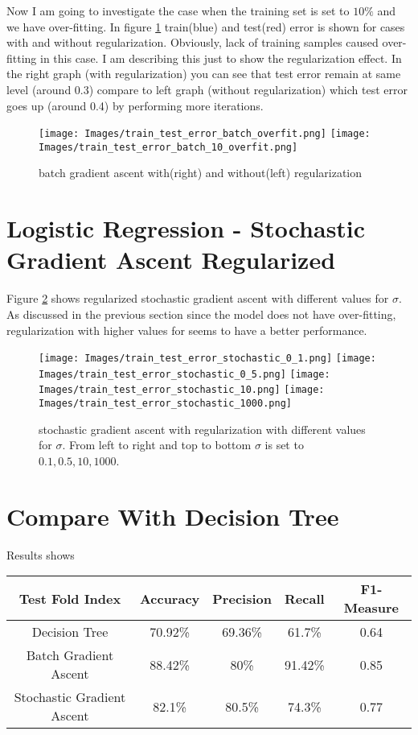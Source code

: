 \documentclass[12pt]{article}
\begin{document}
Now I am going to investigate the case when the training set is set to $10\%$ and we have over-fitting. In figure \ref{over_fitting} train(blue) and test(red) error is shown for cases with and without regularization. Obviously, lack of training samples caused over-fitting in this case. I am describing this just to show the regularization effect. In the right graph (with regularization) you can see that test error remain at same level (around 0.3) compare to left graph (without regularization) which test error goes up (around 0.4) by performing more iterations.
\begin{figure}
  \caption{batch gradient ascent with(right) and without(left) regularization}
  \centering
  \texttt{[image: Images/train\_test\_error\_batch\_overfit.png]}
  \texttt{[image: Images/train\_test\_error\_batch\_10\_overfit.png]}
  \label{over_fitting}
\end{figure}
\newpage
\section{Logistic Regression - Stochastic Gradient Ascent Regularized}
Figure \ref{fig:stochastic_reg} shows regularized stochastic gradient ascent with different values for $\sigma$. As discussed in the previous section since the model does not have over-fitting, regularization with higher values for seems to have a better performance.
\begin{figure}
  \caption{stochastic gradient ascent with regularization with different values for $\sigma$. From left to right and top to bottom $\sigma$ is set to $0.1, 0.5, 10, 1000$.}
  \centering
  \texttt{[image: Images/train\_test\_error\_stochastic\_0\_1.png]}
  \texttt{[image: Images/train\_test\_error\_stochastic\_0\_5.png]}
  \texttt{[image: Images/train\_test\_error\_stochastic\_10.png]}
    \texttt{[image: Images/train\_test\_error\_stochastic\_1000.png]}
  \label{fig:stochastic_reg}
\end{figure}
\newpage
\section{Compare With Decision Tree}
Results shows
\centering
\begin{tabular}{| c | c | c | c | c | }
  \hline
   Test Fold Index& Accuracy & Precision & Recall & F1-Measure \\
  \hline
      Decision Tree& 70.92\%  & 69.36\% & 61.7\% & 0.64  \\
  \hline
      Batch Gradient Ascent& 88.42\%  & 80\% & 91.42\% & 0.85  \\
  \hline
      Stochastic Gradient Ascent& 82.1\%  & 80.5\% & 74.3\% & 0.77  \\
  \hline
\end{tabular}
\end{document}
